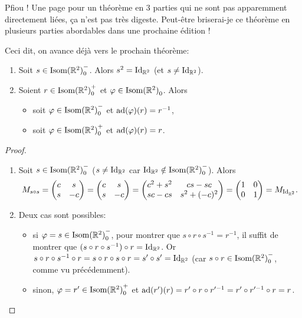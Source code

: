 \documentclass{book}
\numberwithin{equation}{section}
\renewcommand{\phi}{\varphi}
\providecommand{\plan}{{\mathbb R^2}}
\providecommand{\id}{{\textnormal{Id}}}
\providecommand{\idR}{{\id_\plan}}
\providecommand{\isom}{{\textnormal{Isom}(\plan)}}
\providecommand{\isomo}{{\isom_0}}
\providecommand{\isomop}{\isom_0^+}
\providecommand{\isomom}{\isom_0^-}
\providecommand{\ad}{{\textnormal{ad}}}
\begin{document}
Pfiou ! Une page pour un théorème en 3 parties qui ne sont pas apparemment directement liées, ça n'est pas très digeste. Peut-être briserai-je ce théorème en plusieurs parties abordables dans une prochaine édition ! \par
Ceci dit, on avance déjà vers le prochain théorème:

\begin{thm}
	\begin{enumerate}
		\item Soit $s \in \isomom$. Alors $s^2 = \idR$ (et $s \neq \idR$).	
		\item Soient $r \in \isomop$ et $\phi \in \isomo$. Alors 
		\begin{itemize}
			\item soit $\phi \in \isomom$ et $\ad(\phi)(r) = r^{-1}$,
			\item soit $\phi \in \isomop$ et $\ad(\phi)(r) = r$.
		\end{itemize}
	\end{enumerate}
\end{thm}
\begin{proof}
	\begin{enumerate}
	 	\item Soit $s \in \isomom$ ($s \neq \idR$ car $\idR \notin \isomom$). Alors
	 	\begin{equation*}
	 		M_{s \circ s} = \begin{pmatrix}
	 			c&s\\s&-c
	 		\end{pmatrix} = \begin{pmatrix}
	 			c&s\\s&-c
	 		\end{pmatrix} = \begin{pmatrix}
	 			c^2 + s^2 & cs - sc \\
	 			sc - cs & s^2 + (-c)^2
	 		\end{pmatrix} = \begin{pmatrix}
	 			1&0\\0&1
	 		\end{pmatrix}
	 		= M_\idR.
	 	\end{equation*}
	 	\item Deux cas sont possibles:
	 	\begin{itemize}
	 		\item si $\phi = s \in \isomom$, pour montrer que $s \circ r \circ s^{-1} = r^{-1}$, il suffit de montrer que $(s \circ r \circ s^{-1}) \circ r = \idR$. Or $s \circ r \circ s^{-1} \circ r = s \circ r \circ s \circ r = s' \circ s' = \idR$ (car $s \circ r \in \isomom$, comme vu précédemment).
	 		\item sinon, $\phi = r' \in \isomop$ et $\ad(r')(r) = r' \circ r \circ r'^{-1} = r' \circ r'^{-1} \circ r = r$.
	 	\end{itemize}
	\end{enumerate}
\end{proof}
\end{document}
